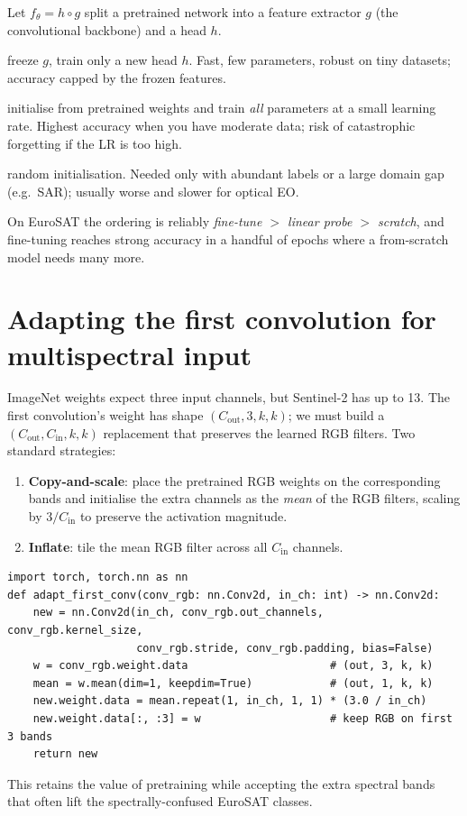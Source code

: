 Let $f_\theta = h \circ g$ split a pretrained network into a feature extractor
$g$ (the convolutional backbone) and a head $h$.
\begin{description}[leftmargin=1.6em,style=nextline]
  \item[Feature extraction (linear probe)] freeze $g$, train only a new head $h$.
  Fast, few parameters, robust on tiny datasets; accuracy capped by the frozen
  features.
  \item[Fine-tuning] initialise from pretrained weights and train \emph{all}
  parameters at a small learning rate. Highest accuracy when you have moderate
  data; risk of catastrophic forgetting if the LR is too high.
  \item[From scratch] random initialisation. Needed only with abundant labels or
  a large domain gap (e.g.\ SAR); usually worse and slower for optical EO.
\end{description}
On EuroSAT the ordering is reliably \emph{fine-tune $>$ linear probe $>$ scratch},
and fine-tuning reaches strong accuracy in a handful of epochs where a
from-scratch model needs many more.

\section{Adapting the first convolution for multispectral input}

ImageNet weights expect three input channels, but Sentinel-2 has up to 13. The
first convolution's weight has shape $(C_\mathrm{out},3,k,k)$; we must build a
$(C_\mathrm{out},C_\mathrm{in},k,k)$ replacement that preserves the learned RGB
filters. Two standard strategies:
\begin{enumerate}[leftmargin=1.5em,nosep]
  \item \textbf{Copy-and-scale}: place the pretrained RGB weights on the
  corresponding bands and initialise the extra channels as the \emph{mean} of the
  RGB filters, scaling by $3/C_\mathrm{in}$ to preserve the activation magnitude.
  \item \textbf{Inflate}: tile the mean RGB filter across all $C_\mathrm{in}$
  channels.
\end{enumerate}
\begin{lstlisting}
import torch, torch.nn as nn
def adapt_first_conv(conv_rgb: nn.Conv2d, in_ch: int) -> nn.Conv2d:
    new = nn.Conv2d(in_ch, conv_rgb.out_channels, conv_rgb.kernel_size,
                    conv_rgb.stride, conv_rgb.padding, bias=False)
    w = conv_rgb.weight.data                      # (out, 3, k, k)
    mean = w.mean(dim=1, keepdim=True)            # (out, 1, k, k)
    new.weight.data = mean.repeat(1, in_ch, 1, 1) * (3.0 / in_ch)
    new.weight.data[:, :3] = w                    # keep RGB on first 3 bands
    return new
\end{lstlisting}
This retains the value of pretraining while accepting the extra spectral bands
that often lift the spectrally-confused EuroSAT classes.

